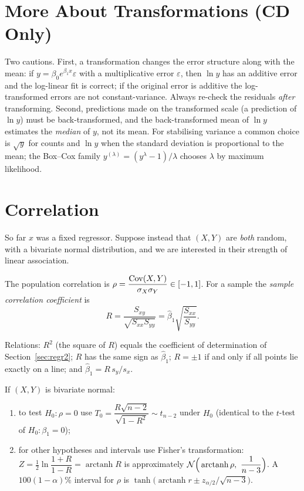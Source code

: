 \section{More About Transformations (CD Only)}

Two cautions. First, a transformation changes the error structure along with the mean: if $y=\beta_0e^{\beta_1x}\varepsilon$ with a multiplicative error $\varepsilon$, then $\ln y$ has an additive error and the log-linear fit is correct; if the original error is additive the log-transformed errors are not constant-variance. Always re-check the residuals \emph{after} transforming. Second, predictions made on the transformed scale (a prediction of $\ln y$) must be back-transformed, and the back-transformed mean of $\ln y$ estimates the \emph{median} of $y$, not its mean. For stabilising variance a common choice is $\sqrt y$ for counts and $\ln y$ when the standard deviation is proportional to the mean; the Box--Cox family $y^{(\lambda)}=(y^\lambda-1)/\lambda$ chooses $\lambda$ by maximum likelihood.

\section{Correlation}

So far $x$ was a fixed regressor. Suppose instead that $(X,Y)$ are \emph{both} random, with a bivariate normal distribution, and we are interested in their strength of linear association.

\begin{definition}
The population correlation is $\rho=\dfrac{\operatorname{Cov}(X,Y)}{\sigma_X\sigma_Y}\in[-1,1]$. For a sample the \emph{sample correlation coefficient} is
\[ R=\frac{S_{xy}}{\sqrt{S_{xx}S_{yy}}}=\hat\beta_1\sqrt{\frac{S_{xx}}{S_{yy}}}. \]
\end{definition}

Relations: $R^2$ (the square of $R$) equals the coefficient of determination of Section~\ref{sec:regr2}; $R$ has the same sign as $\hat\beta_1$; $R=\pm1$ if and only if all points lie exactly on a line; and $\hat\beta_1=R\,s_y/s_x$.

\begin{theorem}\label{thm:corr}
If $(X,Y)$ is bivariate normal:
\begin{enumerate}[label=(\roman*)]
  \item to test $H_0:\rho=0$ use $T_0=\dfrac{R\sqrt{n-2}}{\sqrt{1-R^2}}\sim t_{n-2}$ under $H_0$ (identical to the $t$-test of $H_0:\beta_1=0$);
  \item for other hypotheses and intervals use Fisher's transformation: $Z=\tfrac12\ln\dfrac{1+R}{1-R}=\operatorname{arctanh}R$ is approximately $\Normal\Big(\operatorname{arctanh}\rho,\ \dfrac1{n-3}\Big)$. A $100(1-\alpha)\%$ interval for $\rho$ is $\tanh\big(\operatorname{arctanh}r\pm z_{\alpha/2}/\sqrt{n-3}\big)$.
\end{enumerate}
\end{theorem}

